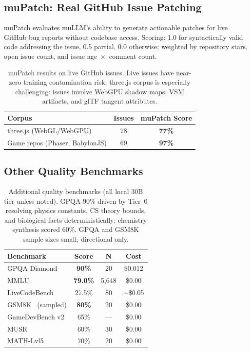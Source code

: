 \documentclass[11pt]{article}
\begin{document}
\subsection{muPatch: Real GitHub Issue Patching}

muPatch evaluates muLLM's ability to generate actionable patches for
live GitHub bug reports without codebase access. Scoring: 1.0 for
syntactically valid code addressing the issue, 0.5 partial, 0.0
otherwise; weighted by repository stars, open issue count, and issue
age~$\times$~comment count.

\begin{table}[t]
\centering
\small
\begin{tabular}{lcc}
\toprule
\textbf{Corpus} & \textbf{Issues} & \textbf{muPatch Score} \\
\midrule
three.js (WebGL/WebGPU) & 78 & \textbf{77\%} \\
Game repos (Phaser, BabylonJS) & 69 & \textbf{97\%} \\
\bottomrule
\end{tabular}
\caption{muPatch results on live GitHub issues. Live issues have
near-zero training contamination risk. three.js corpus is especially
challenging: issues involve WebGPU shadow maps, VSM artifacts, and
glTF tangent attributes.}
\label{tab:mupatch}
\end{table}

\subsection{Other Quality Benchmarks}

\begin{table}[t]
\centering
\small
\begin{tabular}{lccc}
\toprule
\textbf{Benchmark} & \textbf{Score} & \textbf{N} & \textbf{Cost} \\
\midrule
GPQA Diamond & \textbf{90\%} & 20 & \$0.012 \\
MMLU~\cite{hendrycks2021mmlu} & \textbf{79.0\%} & 5,648 & \$0.00 \\
LiveCodeBench & 27.5\% & 80 & $\sim$\$0.05 \\
GSM8K~\cite{cobbe2021gsm8k} (sampled) & \textbf{80\%} & 20 & \$0.00 \\
GameDevBench v2 & 65\% & --- & \$0.00 \\
MUSR & 60\% & 30 & \$0.00 \\
MATH-Lvl5 & 70\% & 20 & \$0.00 \\
\bottomrule
\end{tabular}
\caption{Additional quality benchmarks (all local 30B tier unless
noted). GPQA 90\% driven by Tier~0 resolving physics constants, CS
theory bounds, and biological facts deterministically; chemistry
synthesis scored 60\%. GPQA and GSM8K sample sizes small; directional
only.}
\label{tab:otherbench}
\end{table}
\end{document}
